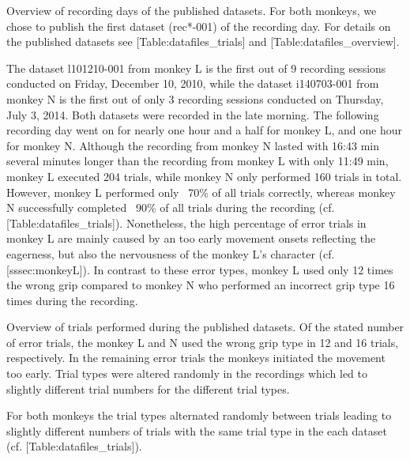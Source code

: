 {%

Overview of recording days of the published datasets. For both monkeys, we chose to publish the first dataset (rec*-001) of the recording day. For details on the published datasets see [Table:datafiles\_trials] and [Table:datafiles\_overview].

The dataset l101210-001 from monkey L is the first out of 9 recording sessions conducted on Friday, December 10, 2010, while the dataset i140703-001 from monkey N is the first out of only 3 recording sessions conducted on Thursday, July 3, 2014. Both datasets were recorded in the late morning. The following recording day went on for nearly one hour and a half for monkey L, and one hour for monkey N. Although the recording from monkey N lasted with 16:43 min several minutes longer than the recording from monkey L with only 11:49 min, monkey L executed 204 trials, while monkey N only performed 160 trials in total. However, monkey L performed only ~70\% of all trials correctly, whereas monkey N successfully completed ~90\% of all trials during the recording (cf. [Table:datafiles\_trials]). Nonetheless, the high percentage of error trials in monkey L are mainly caused by an too early movement onsets reflecting the eagerness, but also the nervousness of the monkey L's character (cf. [sssec:monkeyL]). In contrast to these error types, monkey L used only 12 times the wrong grip compared to monkey N who performed an incorrect grip type 16 times during the recording. 

Overview of trials performed during the published datasets. Of the stated number of error trials, the monkey L and N used the wrong grip type in 12 and 16 trials, respectively. In the remaining error trials the monkeys initiated the movement too early. Trial types were altered randomly in the recordings which led to slightly different trial numbers for the different trial types.

For both monkeys the trial types alternated randomly between trials leading to slightly different numbers of trials with the same trial type in the each dataset (cf. [Table:datafiles\_trials]). 



}

